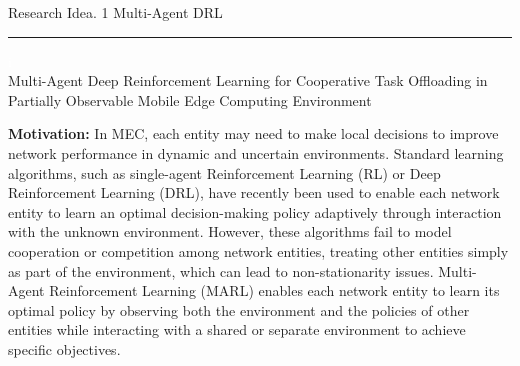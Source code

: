 \documentclass[12pt]{article}
\begin{document}
% 		



\newpage






\begin{center} 
	
	
	\vspace{-17mm}

	\large Research Idea. 1  \hfill Multi-Agent DRL \vspace{1mm} \hrule
	
	\vspace{-1mm}
	
	\textcolor{white}{i} \\ \LARGE Multi-Agent Deep Reinforcement Learning for Cooperative Task Offloading in Partially Observable Mobile Edge Computing Environment \vspace{6mm}\\ 

\end{center} \small
\vspace{-5mm}

\noindent\textbf{\large Motivation:  }
\noindent
In MEC, each entity may need to make local decisions to improve network performance in dynamic and uncertain environments. Standard learning algorithms, such as single-agent Reinforcement Learning (RL) or Deep Reinforcement Learning (DRL), have recently been used to enable each network entity to learn an optimal decision-making policy adaptively through interaction with the unknown environment. However, these algorithms fail to model cooperation or competition among network entities, treating other entities simply as part of the environment, which can lead to non-stationarity issues. Multi-Agent Reinforcement Learning (MARL) enables each network entity to learn its optimal policy by observing both the environment and the policies of other entities while interacting with a shared or separate environment to achieve specific objectives.
 
\end{document}
